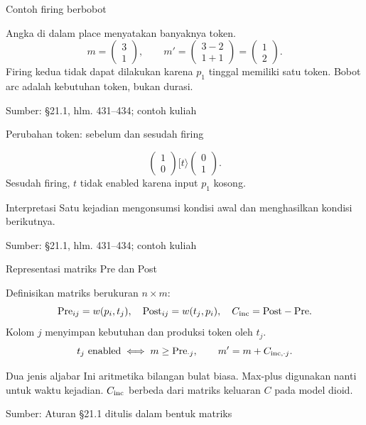 \documentclass[aspectratio=169,11pt]{beamer}
\newcommand{\source}[1]{%
    \vfill
    \hfill{\tiny\color{gray}Sumber: #1}
}
\newcommand{\mpmat}[1]{\begin{pmatrix}#1\end{pmatrix}}
\newcommand{\Pre}{\mathrm{Pre}}
\newcommand{\Post}{\mathrm{Post}}
\newcommand{\tok}[1]{\fill[AcademicBlue] (#1.center) circle (2.2pt);}
\begin{document}
\begin{frame}{Contoh firing berbobot}

\begin{center}\end{center}
Angka di dalam place menyatakan banyaknya token.
\[
m=\mpmat{3\\1},\qquad m'=\mpmat{3-2\\1+1}=\mpmat{1\\2}.
\]
Firing kedua tidak dapat dilakukan karena $p_1$ tinggal memiliki satu token.
Bobot arc adalah kebutuhan token, bukan durasi.

\source{\S21.1, hlm. 431--434; contoh kuliah}
\end{frame}
\begin{frame}{Perubahan token: sebelum dan sesudah firing}

\begin{center}\end{center}
\[
\mpmat{1\\0}[t\rangle\mpmat{0\\1}.
\]
Sesudah firing, $t$ tidak enabled karena input $p_1$ kosong.
\begin{block}{Interpretasi}
Satu kejadian mengonsumsi kondisi awal dan menghasilkan kondisi berikutnya.
\end{block}

\source{\S21.1, hlm. 431--434; contoh kuliah}
\end{frame}
\begin{frame}{Representasi matriks Pre dan Post}

Definisikan matriks berukuran $n\times m$:
\[
\Pre_{ij}=w(p_i,t_j),\quad\Post_{ij}=w(t_j,p_i),\quad C_{\rm inc}=\Post-\Pre.
\]
Kolom $j$ menyimpan kebutuhan dan produksi token oleh $t_j$.
\[
t_j\text{ enabled}\iff m\ge\Pre_{\cdot j},\qquad
m'=m+C_{{\rm inc},\cdot j}.
\]
\begin{block}{Dua jenis aljabar}
Ini aritmetika bilangan bulat biasa. Max-plus digunakan nanti untuk waktu kejadian.
$C_{\rm inc}$ berbeda dari matriks keluaran $C$ pada model dioid.
\end{block}

\source{Aturan \S21.1 ditulis dalam bentuk matriks}
\end{frame}
\end{document}
